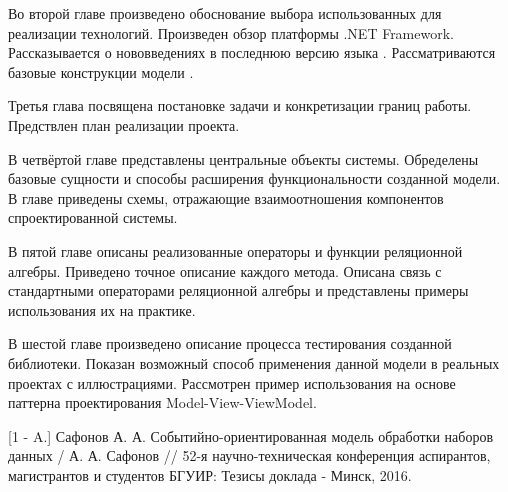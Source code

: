 Во второй главе произведено обоснование выбора использованных для реализации технологий.
Произведен обзор платформы .NET Framework. Рассказывается о нововведениях в последнюю версию языка \csharp{}. Рассматриваются базовые конструкции модели \rx{}.

Третья глава посвящена постановке задачи и конкретизации границ работы. Предствлен план реализации проекта.

В четвёртой главе представлены центральные объекты системы. Обределены базовые сущности и способы расширения функциональности созданной модели. В главе приведены схемы, отражающие взаимоотношения компонентов спроектированной системы.

В пятой главе описаны реализованные операторы и функции реляционной алгебры. Приведено точное описание каждого метода. Описана связь с стандартными операторами реляционной алгебры и представлены примеры использования их на практике.

В шестой главе произведено описание процесса тестирования созданной библиотеки. Показан возможный способ применения данной модели в реальных проектах с иллюстрациями. Рассмотрен пример использования на основе паттерна проектирования Model-View-ViewModel.




[1 - A.] Сафонов А. А. Событийно-ориентированная модель обработки наборов данных / А. А. Сафонов // 52-я научно-техническая конференция аспирантов, магистрантов и студентов БГУИР: Тезисы доклада - Минск, 2016.
